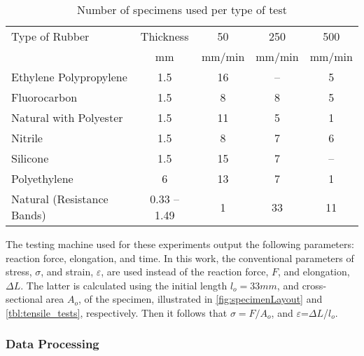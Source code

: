 \begin{table}[htb!]
    \centering
    \caption{Number of specimens used per type of test}
    \begin{tabular}{lcccc}
    \toprule
    Type of Rubber & Thickness &  50 & 250 & 500\\
     & mm & mm/min & mm/min & mm/min \\
    \hline
    Ethylene Polypropylene   	&  1.5 & 16 & -- & 5\\
    Fluorocarbon              	&  1.5 & 8 & 8 & 5\\
    Natural with Polyester   	&  1.5 & 11 & 5 & 1\\
    Nitrile                   	&  1.5 & 8 & 7 & 6\\
    Silicone                  	&  1.5 & 15 & 7 & --\\
    Polyethylene              	&  6 & 13 & 7 & 1\\
    Natural (Resistance Bands)	& 0.33 -- 1.49 & 1 & 33 & 11\\    
    \bottomrule
    \end{tabular}
    \label{tbl:tensile_tests}
\end{table}

The testing machine used for these experiments output the following parameters: reaction force, elongation, and time. In this work, the conventional parameters of stress, $\sigma$, and strain, $\varepsilon$, are used instead of the reaction force, $F$, and elongation, $\Delta L$. The latter is calculated using the initial length $l_o=33 mm$, and cross-sectional area $A_o$, of the specimen, illustrated in \autoref{fig:specimenLayout} and \autoref{tbl:tensile_tests}, respectively. Then it follows that $\sigma=F/A_o$, and $\varepsilon$=$\Delta L$/$l_o$.

\subsubsection{Data Processing} \label{sss:dataProcessing}

